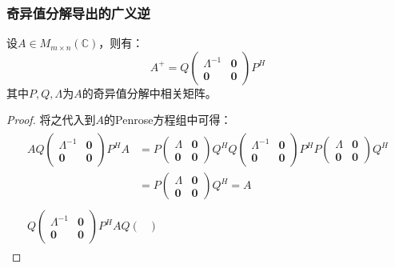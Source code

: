 \subsubsection{奇异值分解导出的广义逆}
\begin{theorem}\label{theo:A+SVD}
	设$A\in M_{m\times n}(\mathbb{C})$，则有：
	\begin{equation*}
		A^+=Q
		\begin{pmatrix}
			\varLambda^{-1} & \mathbf{0} \\
			\mathbf{0} & \mathbf{0}
		\end{pmatrix}
		P^H
	\end{equation*}
	其中$P,Q,\varLambda$为$A$的奇异值分解中相关矩阵。
\end{theorem}
\begin{proof}
	将之代入到$A$的Penrose方程组中可得：
	\begin{gather*}
		\begin{aligned}
			AQ
			\begin{pmatrix}
				\varLambda^{-1} & \mathbf{0} \\
				\mathbf{0} & \mathbf{0}
			\end{pmatrix}
			P^HA
			&=P
			\begin{pmatrix}
				\varLambda & \mathbf{0} \\
				\mathbf{0} & \mathbf{0}
			\end{pmatrix}Q^HQ
			\begin{pmatrix}
				\varLambda^{-1} & \mathbf{0} \\
				\mathbf{0} & \mathbf{0}
			\end{pmatrix}
			P^HP
			\begin{pmatrix}
				\varLambda & \mathbf{0} \\
				\mathbf{0} & \mathbf{0}
			\end{pmatrix}Q^H \\
			&=P\begin{pmatrix}
				\varLambda & \mathbf{0} \\
				\mathbf{0} & \mathbf{0}
			\end{pmatrix}Q^H
			=A
		\end{aligned} \\
		\begin{aligned}
			Q
			\begin{pmatrix}
				\varLambda^{-1} & \mathbf{0} \\
				\mathbf{0} & \mathbf{0}
			\end{pmatrix}
			P^HA
			Q
			\begin{pmatrix}

\end{pmatrix}
\end{aligned}
\end{gather*}
\end{proof}
